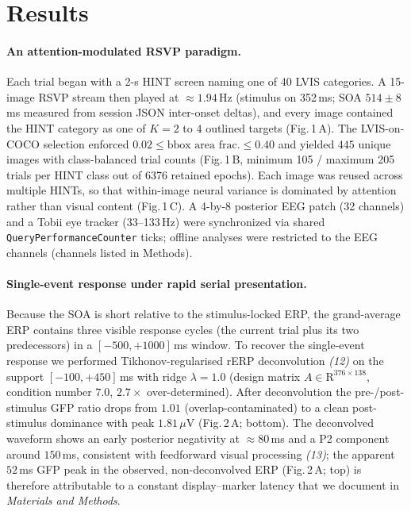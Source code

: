 \documentclass[12pt]{article}
\begin{document}
\section*{Results}

\paragraph*{An attention-modulated RSVP paradigm.}
Each trial began with a 2-s HINT screen naming one of 40 LVIS
categories.  A 15-image RSVP stream then played at $\approx 1.94$\,Hz
(stimulus on 352\,ms; SOA $514\pm 8$\,ms measured from session
JSON inter-onset deltas), and every image contained the HINT
category as one of $K=2$ to $4$ outlined targets (Fig.\,1\,A).  The
LVIS-on-COCO selection enforced $0.02 \leq \mbox{bbox area frac.}
\leq 0.40$ and yielded $445$ unique images with class-balanced
trial counts (Fig.\,1\,B, minimum 105 / maximum 205 trials per
HINT class out of 6376 retained epochs).  Each image was reused
across multiple HINTs, so that within-image neural variance is
dominated by attention rather than visual content (Fig.\,1\,C).
A 4-by-8 posterior EEG patch (32 channels) and a Tobii eye tracker
(33--133\,Hz) were synchronized via shared
\texttt{QueryPerformanceCounter} ticks; offline analyses were
restricted to the EEG channels (channels listed in Methods).

\paragraph*{Single-event response under rapid serial presentation.}
Because the SOA is short relative to the stimulus-locked ERP, the
grand-average ERP contains three visible response cycles (the
current trial plus its two predecessors) in a $[-500,+1000]$\,ms
window.  To recover the single-event response we performed
Tikhonov-regularised rERP deconvolution \textit{(12)} on the
support $[-100,+450]$\,ms with ridge $\lambda=1.0$ (design
matrix $A\in\mbox{R}^{376\times138}$, condition number $7.0$,
$2.7\times$ over-determined).  After deconvolution the
pre-/post-stimulus GFP ratio drops from $1.01$ (overlap-contaminated)
to a clean post-stimulus dominance with peak $1.81$\,$\mu$V
(Fig.\,2\,A; bottom).  The deconvolved waveform shows an early
posterior negativity at $\approx 80$\,ms and a P2 component around
$150$\,ms, consistent with feedforward visual processing
\textit{(13)}; the apparent $52$\,ms GFP peak in the observed,
non-deconvolved ERP (Fig.\,2\,A; top) is therefore attributable
to a constant display--marker latency that we document in
\textit{Materials and Methods}.
\end{document}
